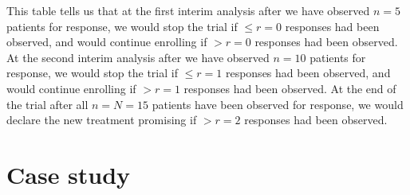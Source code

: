 This table tells us that at the first interim analysis after we have
observed \(n=5\) patients for response, we would stop the trial if
\(\leq r=0\) responses had been observed, and would continue enrolling
if \(> r=0\) responses had been observed. At the second interim analysis
after we have observed \(n=10\) patients for response, we would stop the
trial if \(\leq r=1\) responses had been observed, and would continue
enrolling if \(> r=1\) responses had been observed. At the end of the
trial after all \(n=N=15\) patients have been observed for response, we
would declare the new treatment promising if \(> r=2\) responses had
been observed.

\hypertarget{case-study}{%
\section{Case study}\label{case-study}}

